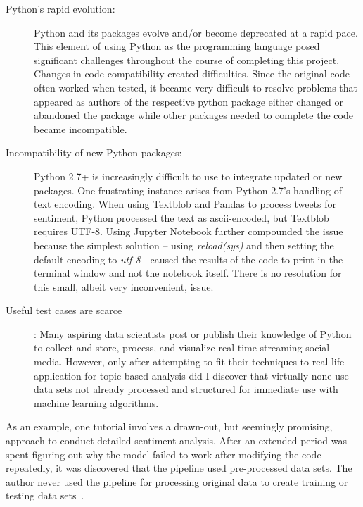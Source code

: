 \begin{description}
\item[Python's rapid evolution:]
Python and its packages evolve and/or become
deprecated at a rapid pace.  This element of using
Python as the programming language posed
significant challenges throughout the course of
completing this project.  Changes in code compatibility created 
difficulties.  Since the original code often worked when tested, it 
became very difficult to resolve problems that appeared as authors of the
respective python package either changed or
abandoned the package while other packages needed to 
complete the code became incompatible.

\item[Incompatibility of new Python packages:] 
Python 2.7+ is increasingly difficult to use to
integrate updated or new packages.  One
frustrating instance arises from Python 2.7's
handling of text encoding.  When using Textblob
and Pandas to process tweets for sentiment, Python
processed the text as ascii-encoded, but Textblob
requires UTF-8.  Using Jupyter Notebook further
compounded the issue because the simplest solution
– using \emph{reload(sys)} and then setting the default
encoding to \emph{utf-8}—caused the results of the
code to print in the terminal window and not the
notebook itself.  There is no resolution for this
small, albeit very inconvenient, issue. 

\item[Useful test cases are scarce]: 
Many aspiring data scientists post or publish
their knowledge of Python to collect and store,
process, and visualize real-time streaming social
media.  However, only after attempting to fit
their techniques to real-life application for
topic-based analysis did I discover that virtually
none use data sets not already processed and
structured for immediate use with machine
learning algorithms.  
\end{description}

As an example, one tutorial involves a drawn-out,
but seemingly promising, approach to conduct
detailed sentiment analysis.  After an extended period was 
spent figuring out why the model failed to
work after modifying the code repeatedly,  it was discovered that
the pipeline used pre-processed data sets.  The author never used
the pipeline for processing original data to
create training or testing data sets~\cite{cranfill2017}.    

